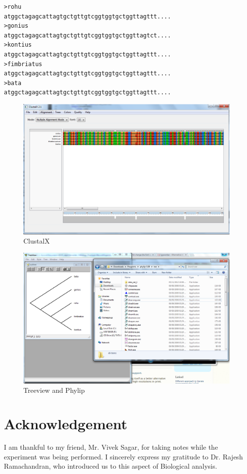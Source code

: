 \begin{lstlisting}[float,caption=Format of the source file,label=tree_sourcefile]
>rohu
atggctagagcattagtgctgttgtcggtggtgctggttagttt....
>gonius
atggctagagcattagtgctgttgtcggtggtgctggttagtct....
>kontius
atggctagagcattagtgctgttgtcggtggtgctggttagttt....
>fimbriatus
atggctagagcattagtgctgttgtcggtggtgctggttagttt....
>bata
atggctagagcattagtgctgttgtcggtggtgctggttagttt....
\end{lstlisting}

\begin{figure}[bth]
	\begin{center}
		\includegraphics[width=1.1\linewidth]{gfx/clustal}
	\end{center}
\caption[ClustalX]{ClustalX}
\label{clustal}
\end{figure}

\begin{figure}[bth]
	\begin{center}
		\includegraphics[width=1.2\linewidth]{gfx/tree}
	\end{center}
\caption[Treeview and Phylip]{Treeview and Phylip}
\label{tree}
\end{figure}


\section{Acknowledgement}
	I am thankful to my friend, Mr. Vivek Sagar, for taking notes while the experiment was being performed. I sincerely express my gratitude to Dr. Rajesh Ramachandran, who introduced us to this aspect of Biological analysis.